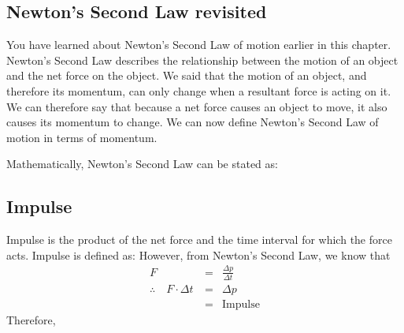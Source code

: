 
\subsection{Newton's Second Law revisited}
You have learned about Newton's Second Law of motion earlier in this chapter.
Newton's Second Law describes the relationship between the motion of an object and the net force on the object. We said that the motion of an object, and therefore its momentum, can only change when a resultant force is acting on it. We can therefore say that because a net force causes an object to move, it also causes its momentum to change. We can now define Newton's Second Law of motion in terms of momentum.\\


Mathematically, Newton's Second Law can be stated as:

\subsection{Impulse}
Impulse is the product of the net force and the time interval for which the force acts. Impulse is defined as:
However, from Newton's Second Law, we know that
\begin{eqnarray*}
F&=&\frac{\Delta p}{\Delta t}\\
\therefore\quad F \cdot \Delta t\ &=& \Delta p\\
&=&\mathrm{Impulse}
\end{eqnarray*}
Therefore,

